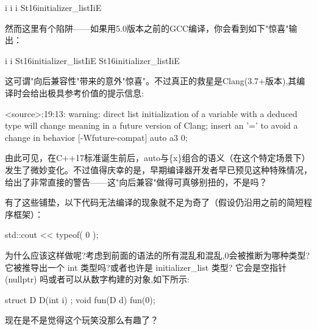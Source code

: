 \begin{shell}
i 
i 
i
St16initializer_listIiE
\end{shell}

然而这里有个陷阱——如果用5.0版本之前的GCC编译，你会看到如下"惊喜"输出：

\begin{shell}
i 
i
St16initializer_listIiE
St16initializer_listIiE
\end{shell}

这可谓"向后兼容性"带来的意外"惊喜"。不过真正的救星是Clang(3.7+版本),其编译时会给出极具参考价值的提示信息:

\begin{shell}
<source>:19:13: warning: direct list initialization of a variable
with a deduced type will change meaning in a future version of Clang;
insert an '=' to avoid a change in behavior [-Wfuture-compat]
  auto a3 {0};
\end{shell}

由此可见，在C++17标准诞生前后，auto与\{x\}组合的语义（在这个特定场景下）发生了微妙变化。不过值得庆幸的是，早期编译器开发者早已预见这种特殊情况，给出了非常直接的警告——这"向后兼容"做得可真够别扭的，不是吗？

有了这些铺垫，以下代码无法编译的现象就不足为奇了（假设仍沿用之前的简短程序框架）：

\begin{cpp}
std::cout << typeof( {0} );
\end{cpp}

为什么应该这样做呢?考虑到前面的语法的所有混乱和混乱,{0}会被推断为哪种类型?它被推导出一个 int 类型吗?或者也许是 initializer\_list 类型? 它会是空指针 (nullptr) 吗或者可以从数字构建的对象,如下所示:

\begin{cpp}
struct D { D(int i) {} };
void fun(D d) { }
fun({0});
\end{cpp}

现在是不是觉得这个玩笑没那么有趣了？









